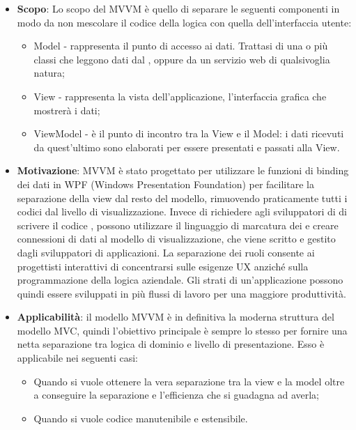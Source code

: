 		\begin{itemize}
		\item \textbf{Scopo}: Lo scopo del MVVM è quello di separare le seguenti componenti in modo da non mescolare il codice della logica con quella dell'interfaccia utente:
		\begin{itemize}
		\item Model - rappresenta il punto di accesso ai dati. Trattasi di una o più classi che leggono dati dal , oppure da un servizio web di qualsivoglia natura;
		\item View - rappresenta la vista dell’applicazione, l’interfaccia grafica che mostrerà i dati;
		\item ViewModel - è il punto di incontro tra la View e il Model: i dati ricevuti da quest’ultimo sono elaborati per essere presentati e passati alla View.
		\end{itemize}

		\item \textbf{Motivazione}: MVVM è stato progettato per utilizzare le funzioni di binding dei dati in WPF (Windows Presentation Foundation) per facilitare la separazione della view dal resto del modello, rimuovendo praticamente tutti i codici  dal livello di visualizzazione. Invece di richiedere agli sviluppatori di  di scrivere il codice , possono utilizzare il linguaggio di marcatura dei  e creare connessioni di dati al modello di visualizzazione, che viene scritto e gestito dagli sviluppatori di applicazioni. La separazione dei ruoli consente ai progettisti interattivi di concentrarsi sulle esigenze UX anziché sulla programmazione della logica aziendale. 
Gli strati di un'applicazione possono quindi essere sviluppati in più flussi di lavoro per una maggiore produttività. 
\item \textbf{Applicabilità}: il modello MVVM è in definitiva la moderna struttura del modello MVC, quindi l'obiettivo principale è sempre lo stesso per fornire una netta separazione tra logica di dominio e livello di presentazione. Esso è applicabile nei seguenti casi:
\begin{itemize}
\item Quando si vuole ottenere la vera separazione tra la view e la model oltre a conseguire la separazione e l'efficienza che si guadagna ad averla;
\item Quando si vuole codice manutenibile e estensibile. 
\end{itemize}
		\end{itemize}
	
